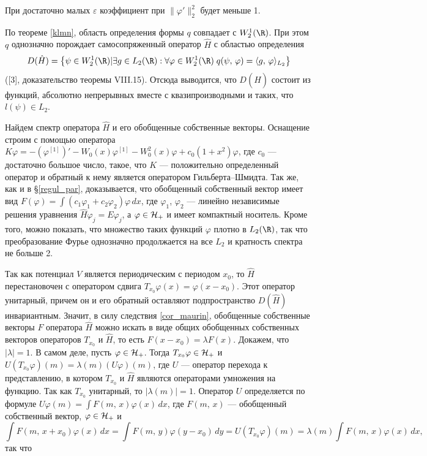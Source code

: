 \documentclass[a4paper
]{article}
\begin{document}
При достаточно малых $\varepsilon$ коэффициент при $\|\varphi'\|_2^2$
будет меньше 1. \par
По теореме \ref{klmn}, область определения формы $q$ совпадает с
$W^1_2(\R)$. При этом $q$ однозначно порождает самосопряженный
оператор $\hat H$ с областью определения $$D(\hat H)=\left\{\psi\in
W^1_2(\R)|\exists g\in L_2(\R):\forall \varphi\in W^1_2(\R)\;
q(\psi, \, \varphi)=\langle g, \, \varphi\rangle_{L_2}\right\}$$
([3], доказательство теоремы VIII.15).
Отсюда выводится, что $D(\hat H)$ состоит из функций, абсолютно
непрерывных вместе с квазипроизводными и таких, что $l(\psi)\in L_2$. \par
Найдем спектр оператора $\hat H$ и его обобщенные собственные векторы.
Оснащение строим с помощью оператора $K\varphi=-(\varphi^{[1]})'-
W_0(x)\varphi^{[1]}-W_0^2(x)\varphi+c_0(1+x^2)\varphi$, где $c_0$ ---
достаточно большое число, такое, что $K$ --- положительно определенный
оператор и обратный к нему является оператором Гильберта--Шмидта. Так же,
как и в \S \ref{regul_par}, доказывается, что обобщенный собственный
вектор имеет вид $F(\varphi)=\int (c_1\varphi_1+c_2\varphi_2)\varphi\,
dx$, где $\varphi_1$, $\varphi_2$ --- линейно независимые решения уравнения
$\hat H\varphi_j=E\varphi_j$, а $\varphi\in {\cal H}_+$ и имеет компактный
носитель. Кроме того, можно показать, что множество таких функций
$\varphi$ плотно в $L_2(\R)$, так что преобразование Фурье однозначно
продолжается на все $L_2$ и кратность спектра не больше 2. \par
Так как потенциал $V$ является периодическим с периодом $x_0$, то $\hat H$
перестановочен с оператором сдвига $T_{x_0}\varphi(x)=\varphi(x-x_0)$.
Этот оператор унитарный, причем он и его обратный оставляют подпространство
$D(\hat H)$ инвариантным. Значит, в силу следствия \ref{cor_maurin},
обобщенные собственные векторы $F$ оператора $\hat H$
можно искать в виде общих обобщенных собственных векторов операторов
$T_{x_0}$ и $\hat H$, то есть $F(x-x_0)=\lambda F(x)$. Докажем, что
$|\lambda|=1$. В самом деле, пусть $\varphi\in {\cal H}_+$.
Тогда $T_{x_0}\varphi\in {\cal H}_+$ и $U(T_{x_0}\varphi)(m)=\lambda(m)
(U\varphi)(m)$, где $U$ --- оператор перехода к представлению, в котором
$T_{x_0}$ и $\hat H$ являются операторами умножения на функцию. Так как
$T_{x_0}$ унитарный, то $|\lambda(m)|=1$. Оператор $U$ определяется по
формуле $U\varphi(m)=\int F(m, \, x)\varphi(x)\, dx$,
где $F(m, \, x)$ --- обобщенный собственный вектор, $\varphi\in {\cal H}_+$
и $$\int F(m, \, x+x_0)\varphi(x)\, dx=\int F(m, \, y)\varphi(y-x_0)\, dy=
U(T_{x_0}\varphi)(m)=\lambda(m)\int F(m, \, x)\varphi(x)\, dx,$$ так что
\end{document}
